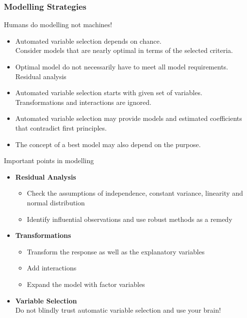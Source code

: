 \documentclass[11pt]{article}
\theoremstyle{definition}
\begin{document}
\subsubsection{Modelling Strategies}
Humans do modelling not machines!
\begin{itemize}
	\item Automated variable selection depends on chance.\\
	Consider models that are nearly optimal in terms of the selected criteria.
	\item Optimal model do not necessarily have to meet all model requirements.\\
	Residual analysis
	\item Automated variable selection starts with given set of variables.\\
	Transformations and interactions are ignored.
	\item Automated variable selection may provide models and estimated coefficients that contradict first principles.
	\item The concept of a best model may also depend on the purpose.
\end{itemize}
Important points in modelling
\begin{itemize}
	\item \textbf{Residual Analysis}
	\begin{itemize}
		\item Check the assumptions of independence, constant variance, linearity and normal distribution
		\item Identify influential observations and use robust methods as a remedy
	\end{itemize}
	\item \textbf{Transformations}
	\begin{itemize}
		\item Transform the response as well as the explanatory variables
		\item Add interactions
		\item Expand the model with factor variables
	\end{itemize}
	\item \textbf{Variable Selection}\\
	Do not blindly trust automatic variable selection and use your brain!
\end{itemize}
\end{document}
